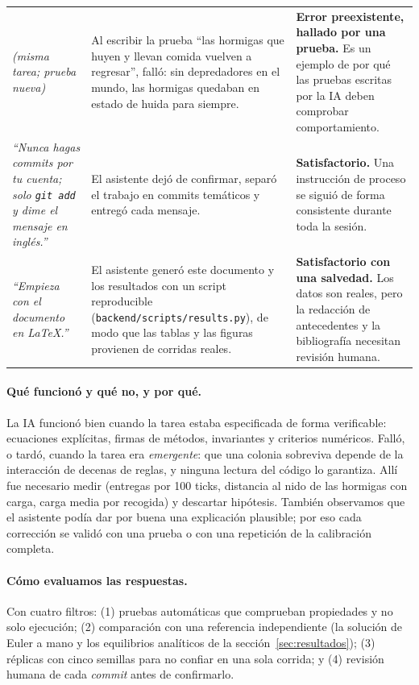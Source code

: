 \documentclass[11pt,a4paper]{article}
\newcommand{\code}[1]{\texttt{\small #1}}
\begin{document}
\begin{xltabular}{\textwidth}{@{}p{3.2cm}XX@{}}
\addlinespace
\textit{(misma tarea; prueba nueva)} &
Al escribir la prueba ``las hormigas que huyen y llevan comida vuelven a regresar'', falló: sin depredadores en el mundo, las hormigas quedaban en estado de huida para siempre. &
\textbf{Error preexistente, hallado por una prueba.} Es un ejemplo de por qué las pruebas escritas por la IA deben comprobar comportamiento. \\
\addlinespace
\textit{``Nunca hagas commits por tu cuenta; solo \code{git add} y dime el mensaje en inglés.''} &
El asistente dejó de confirmar, separó el trabajo en commits temáticos y entregó cada mensaje. &
\textbf{Satisfactorio.} Una instrucción de proceso se siguió de forma consistente durante toda la sesión. \\
\addlinespace
\textit{``Empieza con el documento en \LaTeX.''} &
El asistente generó este documento y los resultados con un script reproducible (\code{backend/scripts/results.py}), de modo que las tablas y las figuras provienen de corridas reales. &
\textbf{Satisfactorio con una salvedad.} Los datos son reales, pero la redacción de antecedentes y la bibliografía necesitan revisión humana. \\
\bottomrule
\end{xltabular}


\paragraph{Qué funcionó y qué no, y por qué.}
La IA funcionó bien cuando la tarea estaba especificada de forma verificable: ecuaciones explícitas, firmas de métodos, invariantes y criterios numéricos. Falló, o tardó, cuando la tarea era \textit{emergente}: que una colonia sobreviva depende de la interacción de decenas de reglas, y ninguna lectura del código lo garantiza. Allí fue necesario medir (entregas por 100 ticks, distancia al nido de las hormigas con carga, carga media por recogida) y descartar hipótesis. También observamos que el asistente podía dar por buena una explicación plausible; por eso cada corrección se validó con una prueba o con una repetición de la calibración completa.

\paragraph{Cómo evaluamos las respuestas.} Con cuatro filtros: (1) pruebas automáticas que comprueban propiedades y no solo ejecución; (2) comparación con una referencia independiente (la solución de Euler a mano y los equilibrios analíticos de la sección~\ref{sec:resultados}); (3) réplicas con cinco semillas para no confiar en una sola corrida; y (4) revisión humana de cada \textit{commit} antes de confirmarlo.
\end{document}
